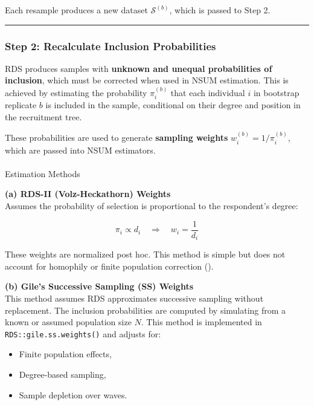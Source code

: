 \documentclass[
  12pt,
  letterpaper,
  DIV=11,
  numbers=noendperiod]{scrartcl}
\makeatletter
\let\oldparagraph\paragraph
\renewcommand{\paragraph}{
    \@ifstar
      \xxxParagraphStar
      \xxxParagraphNoStar
  }
\newcommand{\xxxParagraphStar}[1]{\oldparagraph*{#1}\mbox{}}
\newcommand{\xxxParagraphNoStar}[1]{\oldparagraph{#1}\mbox{}}
\theoremstyle{plain}
\theoremstyle{definition}
\makeatother
\begin{document}
Each resample produces a new dataset \(\mathcal{S}^{(b)}\), which is
passed to Step 2.

\begin{center}\rule{0.5\linewidth}{0.5pt}\end{center}

\subsubsection{Step 2: Recalculate Inclusion
Probabilities}\label{step-2-recalculate-inclusion-probabilities}

RDS produces samples with \textbf{unknown and unequal probabilities of
inclusion}, which must be corrected when used in NSUM estimation. This
is achieved by estimating the probability \(\pi_i^{(b)}\) that each
individual \(i\) in bootstrap replicate \(b\) is included in the sample,
conditional on their degree and position in the recruitment tree.

These probabilities are used to generate \textbf{sampling weights}
\(w_i^{(b)} = 1/\pi_i^{(b)}\), which are passed into NSUM estimators.

\paragraph{Estimation Methods}\label{estimation-methods}

\textbf{(a) RDS-II (Volz-Heckathorn) Weights}\\
Assumes the probability of selection is proportional to the respondent's
degree:

\[\pi_i \propto d_i \quad \Rightarrow \quad w_i = \frac{1}{d_i}\]

These weights are normalized post hoc. This method is simple but does
not account for homophily or finite population correction
(\textcite{volz08-rds}).

\textbf{(b) Gile's Successive Sampling (SS) Weights}\\
This method assumes RDS approximates successive sampling without
replacement. The inclusion probabilities are computed by simulating from
a known or assumed population size \(N\). This method is implemented in
\texttt{RDS::gile.ss.weights()} and adjusts for:

\begin{itemize}
\item
  Finite population effects,
\item
  Degree-based sampling,
\item
  Sample depletion over waves.
\end{itemize}
\end{document}
